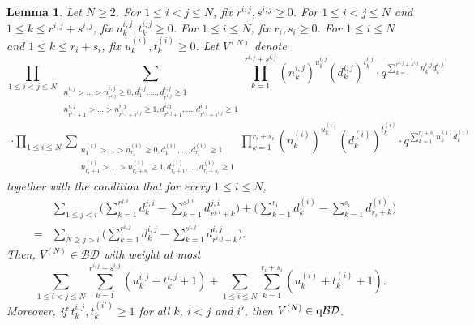 \documentclass[12pt, reqno]{amsart}
\newtheorem{lemma}[theorem]{Lemma}
\theoremstyle{definition}
\theoremstyle{remark}
\numberwithin{equation}{section}
\newcommand{\BD}{\mathcal {BD}}
\newcommand{\qBD}{{\rm q}{\mathcal {BD}}}
\numberwithin{equation}{section}
\begin{document}
\begin{lemma}  \label{lemma_t2t1yq1toNm>0} 
Let $N \ge 2$. For $1 \le i < j \le N$, fix $r^{i,j}, s^{i,j} \ge 0$. 
For $1 \le i < j \le N$ and $1 \le k \le r^{i,j} + s^{i,j}$, 
fix $u_k^{i,j}, t_k^{i,j} \ge 0$. 
For $1 \le i \le N$, fix $r_i, s_i \ge 0$. For $1 \le i \le N$
and $1 \le k \le r_i + s_i$, fix $u_k^{(i)}, t_k^{(i)} \ge 0$. 
Let $V^{(N)}$ denote
$$
\prod_{1 \le i < j \le N}
\sum_{\substack{n_1^{i,j} > \ldots > n_{r^{i,j}}^{i,j} \ge 0, 
    d_1^{i,j}, \ldots, d_{r^{i,j}}^{i,j} \ge 1\\
    n_{r^{i,j}+1}^{i,j} > \ldots > n_{r^{i,j}+s^{i,j}}^{i,j} \ge 1, 
    d_{r^{i,j}+1}^{i,j}, \ldots, d_{r^{i,j}+s^{i,j}}^{i,j} \ge 1}}
  \prod_{k=1}^{r^{i,j}+s^{i,j}} (n_k^{i,j})^{u_k^{i,j}}
    (d_k^{i,j})^{t_k^{i,j}} 
\cdot q^{\sum_{k=1}^{r^{i,j}+s^{i,j}} n_k^{i,j} d_k^{i,j}}
$$
\begin{eqnarray}    \label{lemma_t2t1yq1toNm>0.01}
\cdot \prod_{1 \le i \le N}
\sum_{\substack{n_1^{(i)} > \ldots > n_{r_i}^{(i)} \ge 0, 
    d_1^{(i)}, \ldots, d_{r_i}^{(i)} \ge 1\\
    n_{r_i+1}^{(i)} > \ldots > n_{r_i+s_i}^{(i)} \ge 1,
    d_{r_i+1}^{(i)}, \ldots, d_{r_i+s_i}^{(i)} \ge 1}}
  \prod_{k=1}^{r_i+s_i} (n_k^{(i)})^{u_k^{(i)}} (d_k^{(i)})^{t_k^{(i)}}
\cdot q^{\sum_{k=1}^{r_i+s_i} n_k^{(i)} d_k^{(i)}}
\end{eqnarray}    
together with the condition that for every $1 \le i \le N$,
\begin{eqnarray}    \label{lemma_t2t1yq1toNm>0.02}
& &\sum_{1 \le j < i} \bigg (\sum_{k=1}^{r^{j,i}} d_k^{j,i} 
    - \sum_{k=1}^{s^{j,i}} d_{r^{j,i}+k}^{j,i} \bigg )
  + \bigg (\sum_{k=1}^{r_i} d_k^{(i)} 
    - \sum_{k=1}^{s_i} d_{r_i+k}^{(i)} \bigg )  \nonumber  \\
&=&\sum_{N \ge j > i} \bigg (\sum_{k=1}^{r^{i,j}} d_k^{i,j} 
    - \sum_{k=1}^{s^{i,j}} d_{r^{i,j}+k}^{i,j} \bigg ).
\end{eqnarray}
Then, $V^{(N)} \in \BD$ with weight at most   
$$
\sum_{1 \le i < j \le N} \sum_{k=1}^{r^{i,j}+s^{i,j}} 
  (u_k^{i,j} + t_k^{i,j} + 1)
+ \sum_{1 \le i \le N} \sum_{k=1}^{r_i+s_i} (u_k^{(i)} +t_k^{(i)} +1).
$$
Moreover, if $t_k^{i,j}, t_k^{(i')} \ge 1$ for all $k$, $i < j$ and $i'$, 
then $V^{(N)} \in \qBD$. 
\end{lemma}
\end{document}
